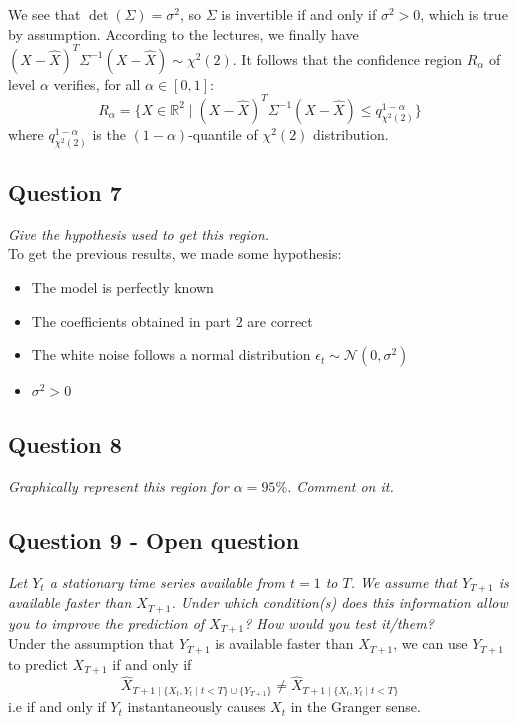 \documentclass[]{article}
\begin{document}
We see that $\det(\Sigma) = \sigma^2$, so $\Sigma$ is invertible if and only if $\sigma^2>0$, which is true by assumption.
According to the lectures, we finally have $(X-\hat{X})^T\Sigma^{-1}(X-\hat{X}) \sim \chi^2(2)$. It follows that the confidence region $R_{\alpha}$ of level $\alpha$ verifies, for all $\alpha\in [0,1]$:
\begin{equation}
	R_{\alpha} = \{X\in \mathbb{R}^2\mid (X-\hat{X})^T\Sigma^{-1}(X-\hat{X}) \leq q_{\chi^2(2)}^{1-\alpha}\}
\end{equation}
where $q_{\chi^2(2)}^{1-\alpha}$ is the $(1-\alpha)$-quantile of $\chi^2(2)$ distribution.
\subsection{Question 7}
\textit{Give the hypothesis used to get this region.}\\

To get the previous results, we made some hypothesis:
\begin{itemize}
	\item The model is perfectly known
	\item The coefficients obtained in part $2$ are correct
	\item The white noise follows a normal distribution $\epsilon_t \sim \mathcal{N}(0, \sigma^2)$
	\item $\sigma^2 > 0$
\end{itemize}

\subsection{Question 8}
\textit{Graphically represent this region for $\alpha = 95\%$. Comment on it.}\\



\subsection{Question 9 -  Open question}
\textit{Let $Y_t$ a stationary time series available from $t=1$ to $T$. We assume that $Y_{T+1}$ is available faster than $X_{T+1}$. Under which condition(s) does this information allow you to improve the prediction of $X_{T+1}$? How would you test it/them?}\\

Under the assumption that $Y_{T+1}$ is available faster than $X_{T+1}$, we can use $Y_{T+1}$ to predict $X_{T+1}$ if and only if
\begin{equation}
	\hat{X}_{T+1\mid \{X_t, Y_t\mid t<T\}\cup \{Y_{T+1}\}} \ne \hat{X}_{T+1\mid \{X_t, Y_t\mid t<T\}}
\end{equation}
i.e if and only if $Y_t$ instantaneously causes $X_t$ in the Granger sense.
\end{document}
